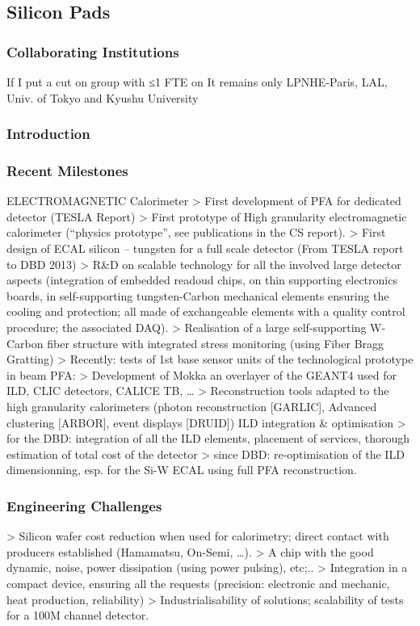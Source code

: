 \subsection{Silicon Pads}
\subsubsection{Collaborating Institutions}
If I put a cut on group with ≤1 FTE on 
It remains only LPNHE-Paris, LAL, Univ. of Tokyo and Kyushu University
\subsubsection{Introduction}
\subsubsection{Recent Milestones}
ELECTROMAGNETIC Calorimeter
> First development of PFA for dedicated detector (TESLA Report)
> First prototype of High granularity electromagnetic calorimeter (“physics prototype”, see publications in the CS report).
> First design of ECAL silicon – tungsten for a full scale detector (From TESLA report to DBD 2013)
> R\&D on scalable technology for all the involved large detector aspects (integration of embedded readoud chips, on thin supporting electronics boards, in self-supporting tungsten-Carbon mechanical elements ensuring the cooling and protection; all made of exchangeable elements with a quality control procedure; the associated DAQ).
> Realisation of a large self-supporting W-Carbon fiber structure with integrated stress monitoring (using Fiber Bragg Gratting) 
> Recently: tests of 1st base sensor units of the technological prototype in beam
PFA:
> Development of Mokka an overlayer of the GEANT4 used for ILD, CLIC detectors, CALICE TB, …
> Reconstruction tools adapted to the high granularity calorimeters (photon reconstruction [GARLIC], Advanced clustering [ARBOR], event displays [DRUID])
ILD integration \& optimisation
> for the DBD: integration of all the ILD elements, placement of services, thorough estimation of total cost of the detector
> since DBD: re-optimisation of the ILD dimensionning, esp. for the Si-W ECAL using full PFA reconstruction.

\subsubsection{Engineering Challenges}
>  Silicon wafer cost reduction when used for calorimetry; direct contact with producers established (Hamamatsu, On-Semi, …).
>  A chip with the good dynamic, noise, power dissipation (using power pulsing), etc;..
> Integration in a compact device, ensuring all the requests (precision: electronic and mechanic, heat production, reliability)
> Industrialisability of solutions; scalability of tests for a 100M channel detector.

